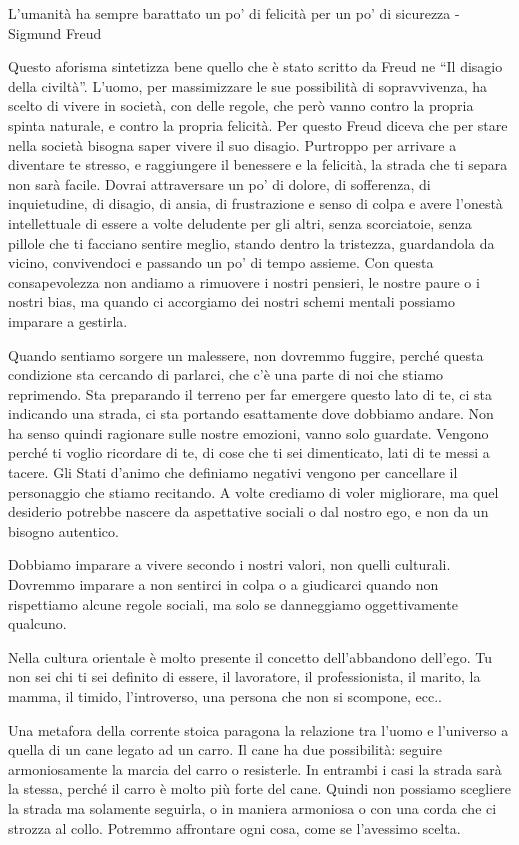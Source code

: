 \documentclass[12pt]{book} %
\begin{document}
L'umanità ha sempre barattato un po' di felicità per un po' di sicurezza - Sigmund Freud

Questo aforisma sintetizza bene quello che è stato scritto da Freud ne “Il disagio della civiltà”.
L'uomo, per massimizzare le sue possibilità di sopravvivenza, ha scelto di vivere in società, con
delle regole, che però vanno contro la propria spinta naturale, e contro la propria
felicità. Per questo Freud diceva che per stare nella società bisogna saper vivere il suo disagio. Purtroppo per
arrivare a diventare te stresso, e raggiungere il benessere e la felicità, la strada che ti separa non sarà facile. 
Dovrai attraversare un po' di dolore, di sofferenza, di inquietudine, di disagio, di ansia, di frustrazione e senso di
colpa e avere l'onestà intellettuale di essere a volte deludente per gli altri, senza scorciatoie,
senza pillole che ti facciano sentire meglio, stando dentro la tristezza, guardandola da vicino, convivendoci e
passando un po' di tempo assieme. Con questa consapevolezza non andiamo a rimuovere i nostri pensieri, le
nostre paure o i nostri bias, ma quando ci accorgiamo dei nostri schemi mentali possiamo imparare a gestirla.

Quando sentiamo sorgere un malessere, non dovremmo fuggire, perché questa condizione sta cercando di
parlarci, che c'è una parte di noi che stiamo reprimendo. Sta preparando il terreno per far emergere
questo lato di te, ci sta indicando una strada, ci sta portando esattamente dove dobbiamo andare. Non ha senso quindi
ragionare sulle nostre emozioni, vanno solo guardate. Vengono perché ti voglio ricordare di te, di cose che ti sei
dimenticato, lati di te messi a tacere. Gli Stati d'animo che definiamo negativi vengono per cancellare il personaggio
che stiamo recitando. A volte crediamo di voler migliorare, ma quel desiderio potrebbe nascere da aspettative sociali o dal nostro ego, e non da un bisogno autentico.

Dobbiamo imparare a vivere secondo i nostri valori, non
quelli culturali. Dovremmo imparare a non sentirci in colpa o a giudicarci quando non rispettiamo alcune regole
sociali, ma solo se danneggiamo oggettivamente qualcuno. 

Nella cultura orientale è molto presente il concetto dell'abbandono dell'ego.
Tu non sei chi ti sei definito di essere, il lavoratore, il professionista, il marito, la mamma, il timido,
l'introverso, una persona che non si scompone, ecc.. 

Una metafora della corrente stoica paragona la relazione tra
l'uomo e l'universo a quella di un cane legato ad un carro. Il cane ha due
possibilità: seguire armoniosamente la marcia del carro o resisterle. In entrambi i casi la strada sarà la stessa,
perché il carro è molto più forte del cane. Quindi non possiamo scegliere la strada ma solamente seguirla, o in maniera
armoniosa o con una corda che ci strozza al collo. Potremmo affrontare ogni cosa, come se l'avessimo scelta.
\end{document}

